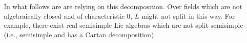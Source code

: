 In what follows are are relying on this decomposition. Over fields which are
not algebraically closed and of characteristic $0$, $L$ might not split in
this way. For example, there exist real semisimple Lie algebras which are not
split semisimple (i.e., semisimple and has a Cartan decomposition).
